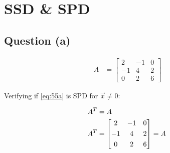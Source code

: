 \section{SSD \& SPD}

	\subsection{Question (a)}
		\begin{align}
			A &= \begin{bmatrix}
					2 & -1 & 0 \\[0.3em]
					-1 & 4 & 2 \\[0.3em]
					0 & 2 & 6
				\end{bmatrix}&
		\label{eq:55a}
		\end{align}

		Verifying if \cref{eq:55a} is SPD for $\vec{x} \neq 0$:

		\begin{align}
			A^{T} &= A& \notag \\
			A^{T} &= \begin{bmatrix}
					2 & -1 & 0 \\[0.3em]
					-1 & 4 & 2 \\[0.3em]
					0 & 2 & 6
				\end{bmatrix} = A&
		\label{eq:55at}
		\end{align}

